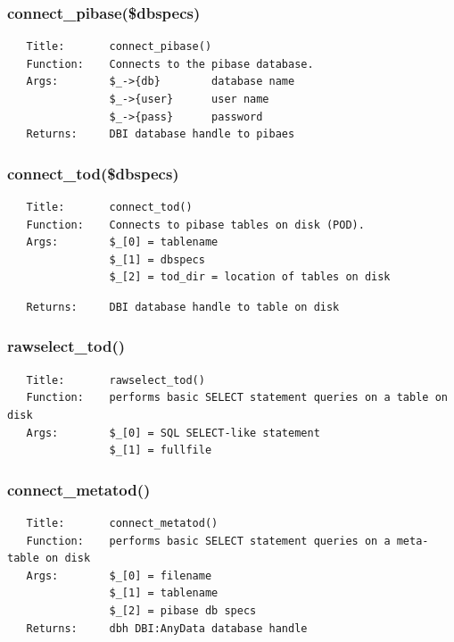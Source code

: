 \documentclass{article}
\begin{document}
\subsubsection*{connect\_pibase(\$dbspecs)\label{pibase_pm_connect_pibase_dbspecs_}}
\begin{verbatim}
   Title:       connect_pibase()
   Function:    Connects to the pibase database.
   Args:        $_->{db}        database name
                $_->{user}      user name
                $_->{pass}      password
   Returns:     DBI database handle to pibaes
\end{verbatim}
\subsubsection*{connect\_tod(\$dbspecs)\label{pibase_pm_connect_tod_dbspecs_}}
\begin{verbatim}
   Title:       connect_tod()
   Function:    Connects to pibase tables on disk (POD).
   Args:        $_[0] = tablename
                $_[1] = dbspecs
                $_[2] = tod_dir = location of tables on disk
\end{verbatim}
\begin{verbatim}
   Returns:     DBI database handle to table on disk
\end{verbatim}
\subsubsection*{rawselect\_tod()\label{pibase_pm_rawselect_tod_}}
\begin{verbatim}
   Title:       rawselect_tod()
   Function:    performs basic SELECT statement queries on a table on disk
   Args:        $_[0] = SQL SELECT-like statement
                $_[1] = fullfile
\end{verbatim}
\subsubsection*{connect\_metatod()\label{pibase_pm_connect_metatod_}}
\begin{verbatim}
   Title:       connect_metatod()
   Function:    performs basic SELECT statement queries on a meta-table on disk
   Args:        $_[0] = filename
                $_[1] = tablename
                $_[2] = pibase db specs
   Returns:     dbh DBI:AnyData database handle
\end{verbatim}
\end{document}
